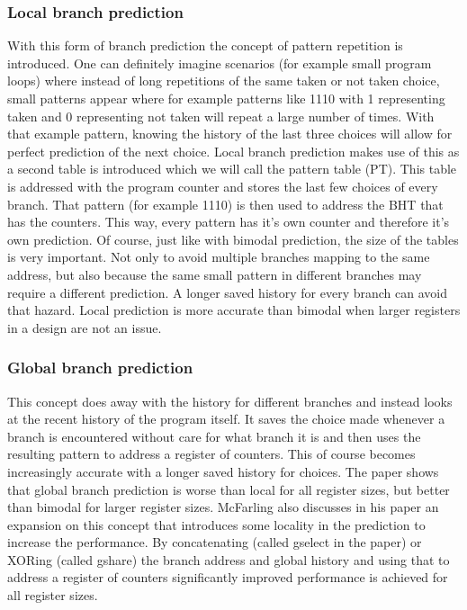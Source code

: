 \subsubsection{Local branch prediction}
With this form of branch prediction the concept of pattern repetition is introduced. One can definitely imagine scenarios (for example small program loops) where instead of long repetitions of the same taken or not taken choice, small patterns appear where for example patterns like 1110 with 1 representing taken and 0 representing not taken will repeat a large number of times. With that example pattern, knowing the history of the last three choices will allow for perfect prediction of the next choice. Local branch prediction makes use of this as a second table is introduced which we will call the pattern table (PT). This table is addressed with the program counter and stores the last few choices of every branch. That pattern (for example 1110) is then used to address the BHT that has the counters. This way, every pattern has it's own counter and therefore it's own prediction. Of course, just like with bimodal prediction, the size of the tables is very important. Not only to avoid multiple branches mapping to the same address, but also because the same small pattern in different branches may require a different prediction. A longer saved history for every branch can avoid that hazard. Local prediction is more accurate than bimodal when larger registers in a design are not an issue.
\subsubsection{Global branch prediction}
This concept does away with the history for different branches and instead looks at the recent history of the program itself. It saves the choice made whenever a branch is encountered without care for what branch it is and then uses the resulting pattern to address a register of counters. This of course becomes increasingly accurate with a longer saved history for choices. The paper shows that global branch prediction is worse than local for all register sizes, but better than bimodal for larger register sizes. McFarling also discusses in his paper an expansion on this concept that introduces some locality in the prediction to increase the performance. By concatenating (called gselect in the paper) or XORing (called gshare) the branch address and global history and using that to address a register of counters significantly improved performance is achieved for all register sizes.
